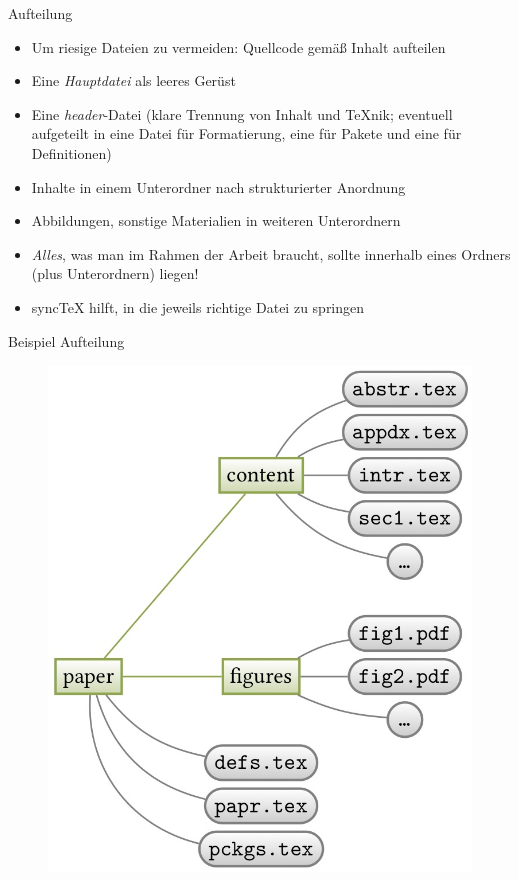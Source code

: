 \documentclass[11pt]{beamer}
\begin{document}
\begin{frame}{Aufteilung}
\begin{itemize}
\item Um riesige Dateien zu vermeiden: Quellcode gemäß Inhalt aufteilen
\item Eine \emph{Hauptdatei} als leeres Gerüst
\item Eine \emph{header}-Datei (klare Trennung von Inhalt und {\TeX}nik; eventuell aufgeteilt in eine Datei für Formatierung, eine für Pakete und eine für Definitionen)
\item Inhalte in einem Unterordner nach strukturierter Anordnung
\item Abbildungen, sonstige Materialien in weiteren Unterordnern
\item \emph{Alles}, was man im Rahmen der Arbeit braucht, sollte innerhalb eines Ordners (plus Unterordnern) liegen!
\item sync{\TeX} hilft, in die jeweils richtige Datei zu springen
\end{itemize}
\end{frame}

\begin{frame}{Beispiel Aufteilung}
\begin{figure}[h]
\centering
\includegraphics[scale=.235]{Ordnerstruktur}
\end{figure}
\end{frame}
\end{document}

